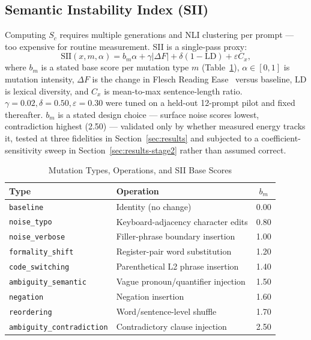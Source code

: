 \documentclass[conference]{IEEEtran}
\begin{document}
\subsection{Semantic Instability Index (SII)}
Computing $S_c$ requires multiple generations and NLI clustering per
prompt --- too expensive for routine measurement. SII is a single-pass
proxy:
\begin{equation}
  \mathrm{SII}(x,m,\alpha) = b_m\alpha + \gamma|\Delta F| +
  \delta(1-\mathrm{LD}) + \varepsilon C_x,
  \label{eq:sii}
\end{equation}
where $b_m$ is a stated base score per mutation type $m$
(Table~\ref{tab:mutations}), $\alpha\in[0,1]$ is mutation intensity,
$\Delta F$ is the change in Flesch Reading
Ease~\cite{flesch1948readability} versus baseline, $\mathrm{LD}$ is
lexical diversity, and $C_x$ is mean-to-max sentence-length ratio.
$\gamma=0.02,\delta=0.50,\varepsilon=0.30$ were tuned on a held-out
12-prompt pilot and fixed thereafter. $b_m$ is a stated design choice
--- surface noise scores lowest, contradiction highest (2.50) ---
validated only by whether measured energy tracks it, tested at three
fidelities in Section~\ref{sec:results} and subjected to a
coefficient-sensitivity sweep in Section~\ref{sec:results-stage2}
rather than assumed correct.
\begin{table}[t]
\caption{Mutation Types, Operations, and SII Base Scores}
\label{tab:mutations}
\centering
\setlength{\tabcolsep}{3.2pt}
\begin{tabular}{@{}llc@{}}
\toprule
\textbf{Type} & \textbf{Operation} & $b_m$ \\
\midrule
\texttt{baseline} & Identity (no change) & 0.00 \\
\texttt{noise\_typo} & Keyboard-adjacency character edits & 0.80 \\
\texttt{noise\_verbose} & Filler-phrase boundary insertion & 1.00 \\
\texttt{formality\_shift} & Register-pair word substitution & 1.20 \\
\texttt{code\_switching} & Parenthetical L2 phrase insertion & 1.40 \\
\texttt{ambiguity\_semantic} & Vague pronoun/quantifier injection & 1.50 \\
\texttt{negation} & Negation insertion & 1.60 \\
\texttt{reordering} & Word/sentence-level shuffle & 1.70 \\
\texttt{ambiguity\_contradiction} & Contradictory clause injection & 2.50 \\
\bottomrule
\end{tabular}
\end{table}
\end{document}
